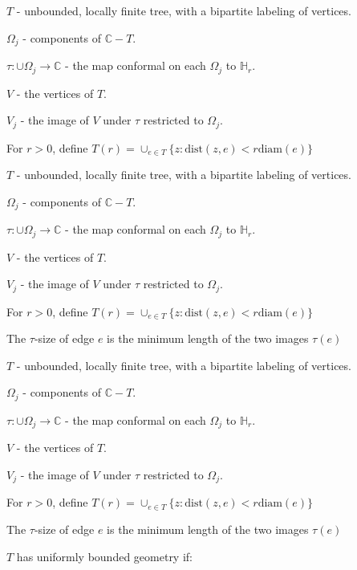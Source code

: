 \documentclass{beamer}
\begin{document}
\begin{frame}

$T$ - unbounded, locally finite tree, with a bipartite labeling of vertices.

$\Omega_j$ - components of $\mathbb{C}-T$.

$\tau: \cup \Omega_j \rightarrow \mathbb{C}$ - the map conformal on each $\Omega_j$ to $\mathbb{H}_r$.

$V$ - the vertices of $T$. 

$V_j$ - the image of $V$ under $\tau$ restricted to $\Omega_j$.

For $r > 0$, define $T(r) = \cup_{e\in T} \{z : \textrm{dist}(z,e) < r\textrm{diam}(e) \}$

\end{frame}





\begin{frame}

$T$ - unbounded, locally finite tree, with a bipartite labeling of vertices.

$\Omega_j$ - components of $\mathbb{C}-T$.

$\tau: \cup \Omega_j \rightarrow \mathbb{C}$ - the map conformal on each $\Omega_j$ to $\mathbb{H}_r$.

$V$ - the vertices of $T$. 

$V_j$ - the image of $V$ under $\tau$ restricted to $\Omega_j$.

For $r > 0$, define $T(r) = \cup_{e\in T} \{z : \textrm{dist}(z,e) < r\textrm{diam}(e) \}$

The $\tau$-size of edge $e$ is the minimum length of the two images $\tau(e)$

\end{frame}




\begin{frame}

$T$ - unbounded, locally finite tree, with a bipartite labeling of vertices.

$\Omega_j$ - components of $\mathbb{C}-T$.

$\tau: \cup \Omega_j \rightarrow \mathbb{C}$ - the map conformal on each $\Omega_j$ to $\mathbb{H}_r$.

$V$ - the vertices of $T$. 

$V_j$ - the image of $V$ under $\tau$ restricted to $\Omega_j$.

For $r > 0$, define $T(r) = \cup_{e\in T} \{z : \textrm{dist}(z,e) < r\textrm{diam}(e) \}$

The $\tau$-size of edge $e$ is the minimum length of the two images $\tau(e)$

\vspace{5mm}

$T$ has uniformly bounded geometry if: 


\end{frame}
\end{document}
